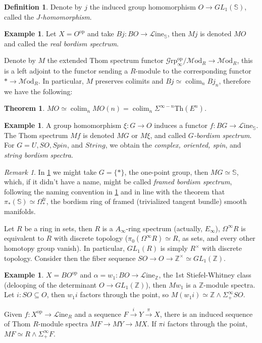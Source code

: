 \documentclass[a4paper]{book}
\newcommand{\lG}{\mathcal{G}}
\newcommand{\lL}{\mathcal{L}}
\newcommand{\lM}{\mathcal{M}}
\newcommand{\bS}{\mathbb{S}}
\newcommand{\bZ}{\mathbb{Z}}
\newcommand{\op}{\mathrm{op}}
\newcommand{\Grp}{\lG\mathrm{rp}} %
\renewcommand{\Line}{\lL\mathrm{ine}} %
\newcommand{\Mod}{\lM\mathrm{od}} %
\DeclareMathOperator*\colim{colim} %
\newtheorem{theorem}[equation]{Theorem}
\theoremstyle{definition}
\newtheorem{definition}[equation]{Definition}
\newtheorem{example}[equation]{Example}
\theoremstyle{remark}
\newtheorem{remark}[equation]{Remark}
\numberwithin{equation}{section}
\begin{document}
\begin{definition}
	Denote by $j$ the induced group homomorphism $O\to GL_1(\bS)$, called the \emph{$J$-homomorphism}.  
\end{definition} 
\begin{example}
	Let $X=O^{\op}$ and take $Bj:BO\to\Line_\bS$, then $Mj$ is denoted $MO$ and called the \emph{real bordism spectrum}. 
\end{example}
Denote by $M$ the extended Thom spectrum functor $\Grp^{\op}_\infty/\Mod_R\to\Mod_R$, this is a left adjoint to the functor sending a $R$-module to the corresponding functor $*\to\Mod_R$. In particular, $M$ preserves colimits and  $Bj\simeq\colim_nBj_n$, therefore we have the following:
\begin{theorem}
	$MO\simeq\colim_nMO(n)=\colim_n\Sigma^{\infty-n}\mathrm{Th}(E^n)$. 
\end{theorem}
\begin{example}\label{ex:bordismspectra}
	A group homomorphism $\xi:G\to O$ induces a functor $f:BG\to\Line_\bS$. The Thom spectrum $Mf$ is denoted $MG$ or $M\xi$, and called \emph{$G$-bordism spectrum}. For $G=U,SO,Spin$, and $String$, we obtain the \emph{complex, oriented, spin}, and \emph{string bordism spectra}. 
\end{example}
\begin{remark}
	In \cref{ex:bordismspectra} we might take $G=\{*\}$, the one-point group, then $MG\simeq\bS$, which, if it didn't have a name, might be called \emph{framed bordism spectrum}, following the naming convention in \cref{ex:bordismspectra} and in line with the theorem that $\pi_*(\bS)\simeq\Omega^\mathrm{fr}_*$, the bordism ring of framed (trivialized tangent bundle) smooth manifolds.  
\end{remark}
Let $R$ be a ring in sets, then $R$ is a $A_\infty$-ring spectrum (actually, $E_\infty$), $\Omega^\infty R$ is equivalent to $R$ with discrete topology ($\pi_0(\Omega^\infty R)\simeq R$, as sets, and every other homotopy group vanish). In particular, $GL_1(R)$ is simply $R^\times$ with discrete topology. Consider then the fiber sequence $SO\to O\to \bZ^\times\simeq GL_1(\bZ)$.
\begin{example}
	$X=BO^{\op}$ and $\alpha=w_1:BO\to\Line_\bZ$, the 1st Stiefel-Whitney class (delooping of the determinant $O\to GL_1(\bZ)$), then $Mw_1$ is a $\bZ$-module spectra. Let $i:SO\subseteq O$, then $w_1i$ factors through the point, so $M(w_1i)\simeq\bZ\wedge\Sigma^\infty_+SO$. 
\end{example}
Given $f:X^{\op}\to\Line_R$ and a sequence $F\xrightarrow{i} Y\xrightarrow{\pi} X$, there is an induced sequence of Thom $R$-module spectra $MF\to MY\to MX$. If $\pi i$ factors through the point, $MF\simeq R\wedge\Sigma^\infty_+F$. 
\end{document}
